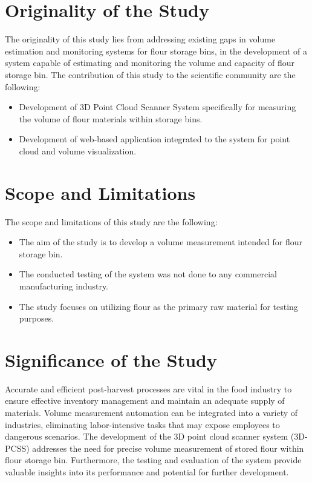 \section{Originality of the Study}
\label{intro:sec:Originality of the Study}
The originality of this study lies from addressing existing gaps in volume estimation and monitoring systems for flour storage bins, in the development of a system capable of estimating and monitoring the volume and capacity of flour storage bin. The contribution of this study to the scientific community are the following:

\begin{itemize}
	\item Development of 3D Point Cloud Scanner System specifically for measuring the volume of flour materials within storage bins.
	\item Development of web-based application integrated to the system for point cloud and volume visualization.
\end{itemize}

\section{Scope and Limitations}
\label{intro:sec:Scope and Limitations}

The scope and limitations of this study are the following:

\begin{itemize}
	\item The aim of the study is to develop a volume measurement intended for flour storage bin.
	\item The conducted testing of the system was not done to any commercial manufacturing industry.
	\item The study focuses on utilizing flour as the primary raw material for testing purposes.
\end{itemize}

\section{Significance of the Study}
\label{intro:sec:Significance of the Study}

Accurate and efficient post-harvest processes are vital in the food industry to ensure effective inventory management and maintain an adequate supply of materials. Volume measurement automation can be integrated into a variety of industries, eliminating labor-intensive tasks that may expose employees to dangerous scenarios. The development of the 3D point cloud scanner system (3D-PCSS) addresses the need for precise volume measurement of stored flour within flour storage bin. Furthermore, the testing and evaluation of the system provide valuable insights into its performance and potential for further development.

